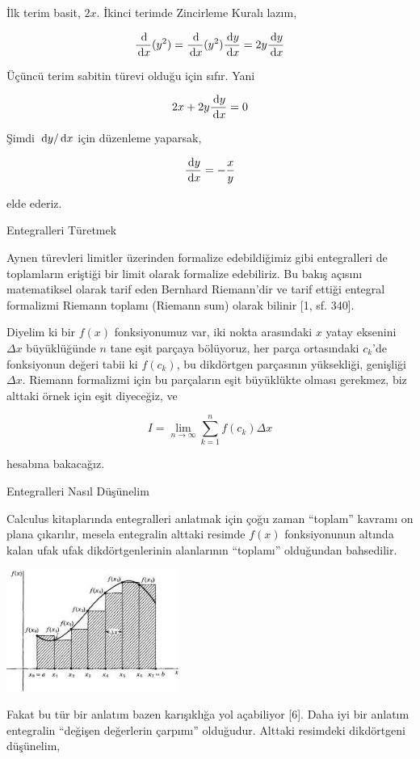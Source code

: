 \documentclass[12pt,fleqn]{article}\usepackage{../../common}
\begin{document}
İlk terim basit, $2x$. İkinci terimde Zincirleme Kuralı lazım,

$$
\frac{\,\mathrm{d}}{\,\mathrm{d} x} (y^2) = \frac{\,\mathrm{d}}{\,\mathrm{d} x} (y^2) \frac{\,\mathrm{d} y}{\,\mathrm{d} x} =
2y \frac{\,\mathrm{d} y}{\,\mathrm{d} x}
$$

Üçüncü terim sabitin türevi olduğu için sıfır. Yani

$$
2x + 2y \frac{\,\mathrm{d} y}{\,\mathrm{d} x} = 0
$$

Şimdi $\,\mathrm{d} y / \,\mathrm{d} x$ için düzenleme yaparsak,

$$
\frac{\,\mathrm{d} y}{\,\mathrm{d} x} = -\frac{x}{y}
$$

elde ederiz.

Entegralleri Türetmek

Aynen türevleri limitler üzerinden formalize edebildiğimiz gibi
entegralleri de toplamların eriştiği bir limit olarak formalize
edebiliriz. Bu bakış açısını matematiksel olarak tarif eden Bernhard
Riemann'dir ve tarif ettiği entegral formalizmi Riemann toplamı (Riemann
sum) olarak bilinir [1, sf. 340]. 

Diyelim ki bir $f(x)$ fonksiyonumuz var, iki nokta arasındaki $x$ yatay
eksenini $\Delta x$ büyüklüğünde $n$ tane eşit parçaya bölüyoruz, her parça
ortasındaki $c_k$'de fonksiyonun değeri tabii ki $f(c_k)$, bu dikdörtgen
parçasının yüksekliği, genişliği $\Delta x$. Riemann formalizmi için bu
parçaların eşit büyüklükte olması gerekmez, biz alttaki örnek için eşit
diyeceğiz, ve

$$ 
I = \lim_{n \to \infty} \sum_{k=1}^{n} f(c_k) \Delta x
$$

hesabına bakacağız.

Entegralleri Nasıl Düşünelim

Calculus kitaplarında entegralleri anlatmak için çoğu zaman ``toplam''
kavramı on plana çıkarılır, mesela entegralin alttaki resimde $f(x)$
fonksiyonunun altında kalan ufak ufak dikdörtgenlerinin alanlarının
``toplamı'' olduğundan bahsedilir.

\includegraphics[height=4cm]{area.png}

Fakat bu tür bir anlatım bazen karışıklığa yol açabiliyor [6]. Daha iyi bir
anlatım entegralin ``değişen değerlerin çarpımı'' olduğudur. Alttaki
resimdeki dikdörtgeni düşünelim, 
\end{document}
